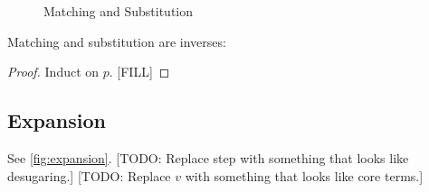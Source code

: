 \begin{figure}
\begin{multicols}{2}



\end{multicols}
\vspace{1em}




\caption{Matching and Substitution}
\end{figure}

\begin{lemma}
  Matching and substitution are inverses:
\end{lemma}
\begin{proof}
  Induct on $p$.
  [FILL]
\end{proof}

\subsection{Expansion}

See \cref{fig:expansion}.
[TODO: Replace step with something that looks like desugaring.]
[TODO: Replace $v$ with something that looks like core terms.]

